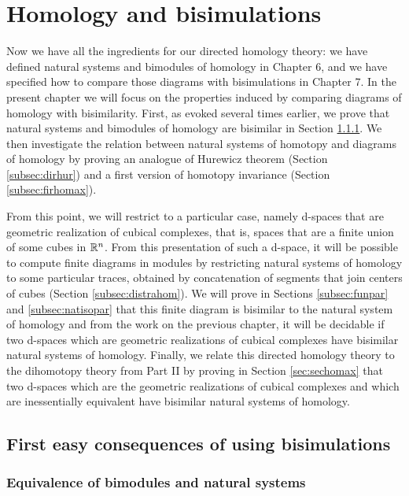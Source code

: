 \chapter{Homology and bisimulations}
\label{chap:hombis}



Now we have all the ingredients for our directed homology theory: we have defined natural systems and bimodules of homology in Chapter 6, and we have specified how to compare those diagrams with bisimulations in Chapter 7. In the present chapter we will focus on the properties induced by comparing diagrams of homology with bisimilarity. First, as evoked several times earlier, we prove that natural systems and bimodules of homology are bisimilar in Section \ref{subsec:equibina}. We then investigate the relation between natural systems of homotopy and diagrams of homology by proving an analogue of Hurewicz theorem (Section \ref{subsec:dirhur}) and a first version of homotopy invariance (Section \ref{subsec:firhomax}).

From this point, we will restrict to a particular case, namely d-spaces that are geometric realization of cubical complexes, that is, spaces that are a finite union of some cubes in $\mathbb{R}^n$. From this presentation of such a d-space, it will be possible to compute finite diagrams in modules by restricting natural systems of homology to some particular traces, obtained by concatenation of segments that join centers of cubes (Section \ref{subsec:distrahom}). We will prove in Sections \ref{subsec:funpar} and \ref{subsec:natisopar} that this finite diagram is bisimilar to the natural system of homology and from the work on the previous chapter, it will be decidable if two d-spaces which are geometric realizations of cubical complexes have bisimilar natural systems of homology. Finally, we relate this directed homology theory to the dihomotopy theory from Part II by proving in Section \ref{sec:sechomax} that two d-spaces which are the geometric realizations of cubical complexes and which are inessentially equivalent have bisimilar natural systems of homology.



\section{First easy consequences of using bisimulations}

\subsection{Equivalence of bimodules and natural systems}
\label{subsec:equibina}

